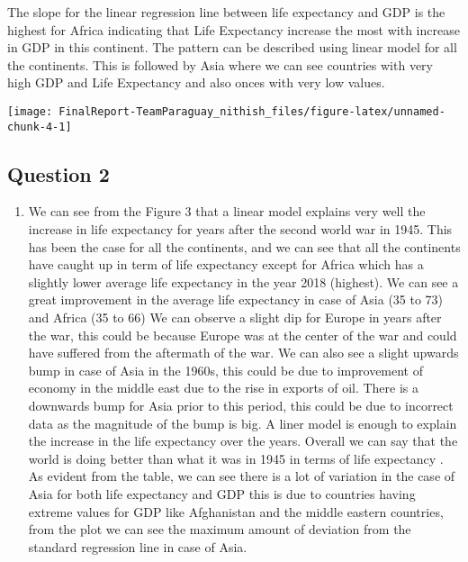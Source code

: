 \documentclass[]{article}
\providecommand{\tightlist}{%
  \setlength{\itemsep}{0pt}\setlength{\parskip}{0pt}}
\begin{document}
The slope for the linear regression line between life expectancy and GDP
is the highest for Africa indicating that Life Expectancy increase the
most with increase in GDP in this continent. The pattern can be
described using linear model for all the continents. This is followed by
Asia where we can see countries with very high GDP and Life Expectancy
and also onces with very low values.

\begin{center}\texttt{[image: FinalReport-TeamParaguay\_nithish\_files/figure-latex/unnamed-chunk-4-1]} \end{center}

\hypertarget{question-2}{%
\subsection{Question 2}\label{question-2}}

\begin{enumerate}
\def\labelenumi{\arabic{enumi}.}
\setcounter{enumi}{1}
\tightlist
\item
  We can see from the Figure 3 that a linear model explains very well
  the increase in life expectancy for years after the second world war
  in 1945. This has been the case for all the continents, and we can see
  that all the continents have caught up in term of life expectancy
  except for Africa which has a slightly lower average life expectancy
  in the year 2018 (highest). We can see a great improvement in the
  average life expectancy in case of Asia (35 to 73) and Africa (35 to
  66) We can observe a slight dip for Europe in years after the war,
  this could be because Europe was at the center of the war and could
  have suffered from the aftermath of the war. We can also see a slight
  upwards bump in case of Asia in the 1960s, this could be due to
  improvement of economy in the middle east due to the rise in exports
  of oil. There is a downwards bump for Asia prior to this period, this
  could be due to incorrect data as the magnitude of the bump is big. A
  liner model is enough to explain the increase in the life expectancy
  over the years. Overall we can say that the world is doing better than
  what it was in 1945 in terms of life expectancy . As evident from the
  table, we can see there is a lot of variation in the case of Asia for
  both life expectancy and GDP this is due to countries having extreme
  values for GDP like Afghanistan and the middle eastern countries, from
  the plot we can see the maximum amount of deviation from the standard
  regression line in case of Asia.
\end{enumerate}
\end{document}
